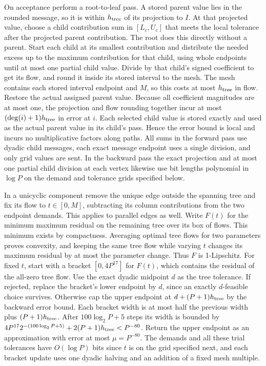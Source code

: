\documentclass[11pt]{article}
\begin{document}
On acceptance perform a root-to-leaf pass. A stored parent value lies in the rounded message, so it is within \(h_{\rm tree}\) of its projection to \(I\). At that projected value, choose a child contribution sum in \([L_c,U_c]\) that meets the local tolerance after the projected parent contribution. The root does this directly without a parent. Start each child at its smallest contribution and distribute the needed excess up to the maximum contribution for that child, using whole endpoints until at most one partial child value. Divide by that child's signed coefficient to get its flow, and round it inside its stored interval to the mesh. The mesh contains each stored interval endpoint and \(M\), so this costs at most \(h_{\rm tree}\) in flow. Restore the actual assigned parent value. Because all coefficient magnitudes are at most one, the projection and flow rounding together incur at most \((\deg(i)+1)h_{\rm tree}\) in error at \(i\). Each selected child value is stored exactly and used as the actual parent value in its child's pass. Hence the error bound is local and incurs no multiplicative factors along paths. All sums in the forward pass use dyadic child messages, each exact message endpoint uses a single division, and only grid values are sent. In the backward pass the exact projection and at most one partial child division at each vertex likewise use bit lengths polynomial in \(\log P\) on the demand and tolerance grids specified below.

In a unicyclic component remove the unique edge outside the spanning tree and fix its flow to \(t\in[0,M]\), subtracting its column contributions from the two endpoint demands. This applies to parallel edges as well. Write \(F(t)\) for the minimum maximum residual on the remaining tree over its box of flows. This minimum exists by compactness. Averaging optimal tree flows for two parameters proves convexity, and keeping the same tree flow while varying \(t\) changes its maximum residual by at most the parameter change. Thus \(F\) is 1-Lipschitz. For fixed \(t\), start with a bracket \([0,4P^{17}]\) for \(F(t)\), which contains the residual of the all-zero tree flow. Use the exact dyadic midpoint \(d\) as the tree tolerance. If rejected, replace the bracket's lower endpoint by \(d\), since an exactly \(d\)-feasible choice survives. Otherwise cap the upper endpoint at \(d+(P+1)h_{\rm tree}\) by the backward error bound. Each bracket width is at most half the previous width plus \((P+1)h_{\rm tree}\). After \(100\log_2 P+5\) steps its width is bounded by \(4P^{17}2^{-(100\log_2P+5)}+2(P+1)h_{\rm tree}<P^{-80}\). Return the upper endpoint as an approximation with error at most \(\mu=P^{-80}\). The demands and all these trial tolerances have \(O(\log P)\) bits since \(t\) is on the grid specified next, and each bracket update uses one dyadic halving and an addition of a fixed mesh multiple.
\end{document}
